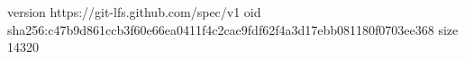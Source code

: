 version https://git-lfs.github.com/spec/v1
oid sha256:c47b9d861ccb3f60e66ea0411f4c2cae9fdf62f4a3d17ebb081180f0703ee368
size 14320
